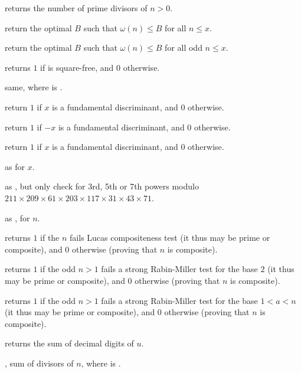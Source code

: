  returns the number of prime divisors of $n > 0$.

 return the optimal $B$ such that $\omega(n)
\leq B $ for all $n \leq x$.

 return the optimal $B$ such that $\omega(n)
\leq B $ for all odd $n \leq x$.

 returns $1$ if 
is square-free, and $0$ otherwise.

 same, where  is
.

 return $1$ if $x$ is a fundamental
discriminant, and $0$ otherwise.

 return $1$ if $-x$ is a fundamental
discriminant, and $0$ otherwise.

 return $1$ if $x$ is a fundamental
discriminant, and $0$ otherwise.

 as 
for  $x$.

 as , but
only check for 3rd, 5th or 7th powers modulo
$211\times209\times61\times203\times117\times31\times43\times71$.

 as , for
 $n$.

 returns $1$ if the  $n$ fails Lucas
compositeness test (it thus may be prime or composite), and $0$ otherwise
(proving that $n$ is composite).

 returns $1$ if the odd  $n > 1$ fails a
strong Rabin-Miller test for the base $2$ (it thus may be prime or
composite), and $0$ otherwise (proving that $n$ is composite).

 returns $1$ if the odd  $n > 1$
fails a strong Rabin-Miller test for the base $1 < a < n$ (it thus may be
prime or composite), and $0$ otherwise (proving that $n$ is composite).

 returns the sum of decimal digits of $u$.

, sum of divisors of  $n$, where
 is .

